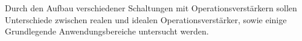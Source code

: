 Durch den Aufbau verschiedener Schaltungen mit Operationsverstärkern sollen
Unterschiede zwischen realen und idealen Operationsverstärker, sowie einige
Grundlegende Anwendungsbereiche untersucht werden.
